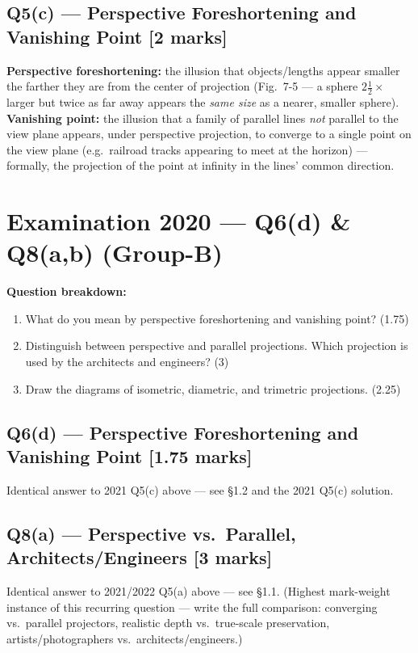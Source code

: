 \documentclass[12pt, a4paper]{article}
\newenvironment{solutionbox}{\begin{mdframed}[style=solutionframe]}{\end{mdframed}}
\newenvironment{answerbox}{\begin{mdframed}[style=answerframe]}{\end{mdframed}}
\begin{document}
\subsection*{Q5(c) --- Perspective Foreshortening and Vanishing Point [2 marks]}
\begin{answerbox}
\textbf{Perspective foreshortening:} the illusion that objects/lengths appear smaller the farther they are from the center of projection (Fig.\ 7-5 --- a sphere $2\tfrac12\times$ larger but twice as far away appears the \emph{same size} as a nearer, smaller sphere). \textbf{Vanishing point:} the illusion that a family of parallel lines \emph{not} parallel to the view plane appears, under perspective projection, to converge to a single point on the view plane (e.g.\ railroad tracks appearing to meet at the horizon) --- formally, the projection of the point at infinity in the lines' common direction.
\end{answerbox}

\section{Examination 2020 --- Q6(d) \& Q8(a,b) (Group-B)}
\begin{solutionbox}
\textbf{Question breakdown:}
\begin{enumerate}[noitemsep]
  \item[Q6(d)] What do you mean by perspective foreshortening and vanishing point? (1.75)
  \item[Q8(a)] Distinguish between perspective and parallel projections. Which projection is used by the architects and engineers? (3)
  \item[Q8(b)] Draw the diagrams of isometric, diametric, and trimetric projections. (2.25)
\end{enumerate}
\end{solutionbox}

\subsection*{Q6(d) --- Perspective Foreshortening and Vanishing Point [1.75 marks]}
\begin{answerbox}
Identical answer to 2021 Q5(c) above --- see \S1.2 and the 2021 Q5(c) solution.
\end{answerbox}

\subsection*{Q8(a) --- Perspective vs.\ Parallel, Architects/Engineers [3 marks]}
\begin{answerbox}
Identical answer to 2021/2022 Q5(a) above --- see \S1.1. (Highest mark-weight instance of this recurring question --- write the full comparison: converging vs.\ parallel projectors, realistic depth vs.\ true-scale preservation, artists/photographers vs.\ architects/engineers.)
\end{answerbox}
\end{document}
